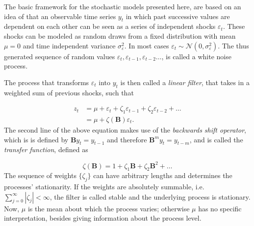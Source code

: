 The basic framework for the stochastic models presented here, are based on an idea of \citet{yule1927vii} that an observable time series $y_t$ in which past successive values are dependent on each other can be seen as a series of independent shocks $\varepsilon_t$. These shocks can be modeled as random draws from a fixed distribution with mean $\mu = 0$ and time independent variance $\sigma^2_\varepsilon$. In most cases $\varepsilon_t \sim \mathcal{N} \left(0, \sigma^2_\varepsilon \right) $. The thus generated sequence of random values $\varepsilon_t, \varepsilon_{t-1}, \varepsilon_{t-2} \dots$, is called a white noise process.

The process that transforms $\varepsilon_t$ into $y_t$ is then called a \textit{linear filter}, that takes in a weighted sum of previous shocks, such that

\begin{equation}
	\begin{aligned}
		z_{t} &=\mu+\varepsilon_{t}+\zeta_{1} \varepsilon_{t-1}+\zeta_{2} \varepsilon_{t-2}+ \dots \\
		&=\mu+\zeta(\boldsymbol{B}) \varepsilon_{t}.
	\end{aligned}
\end{equation}
%
The second line of the above equation makes use of the \textit{backwards shift operator}, which is is defined by $\boldsymbol{B} y_t = y_{t-1}$ and therefore $\boldsymbol{B}^m y_t = y_{t-m}$, and is called the \textit{transfer function}, defined as

\begin{equation*}
	\zeta(\boldsymbol{B})=1+\zeta_{1} \boldsymbol{B} + \zeta_{2} \boldsymbol{B}^{2}+\dots
\end{equation*}
%
The sequence of weights $\{\zeta_j\}$ can have arbitrary lengths and determines the processes' stationarity. If the weights are absolutely summable, i.e. $\sum_{j=0}^{\infty}\left|\zeta_{j}\right|<\infty$, the filter is called stable and the underlying process is stationary. Now, $\mu$ is the mean about which the process varies; otherwise $\mu$ has no specific interpretation, besides giving information about the process level.




















